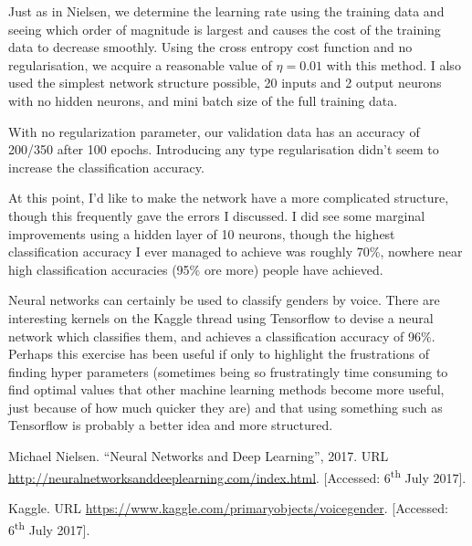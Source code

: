 \documentclass[10pt]{article}
\begin{document}
Just as in Nielsen, we determine the learning rate using the training data and seeing which order of magnitude is largest and causes the cost of the training data to decrease smoothly. Using the cross entropy cost function and no regularisation, we acquire a reasonable value of $\eta = 0.01$ with this method. I also used the simplest network structure possible, 20 inputs and 2 output neurons with no hidden neurons, and mini batch size of the full training data. \par
With no regularization parameter, our validation data has an accuracy of 200/350 after 100 epochs. Introducing any type regularisation didn't seem to increase the classification accuracy. \par
At this point, I'd like to make the network have a more complicated structure, though this frequently gave the errors I discussed. I did see some marginal improvements using a hidden layer of 10 neurons, though the highest classification accuracy I ever managed to achieve was roughly 70$\%$, nowhere near high  classification accuracies (95$\%$ ore more) people have achieved. \par
Neural networks can certainly be used to classify genders by voice. There are interesting kernels on the Kaggle thread using Tensorflow to devise a neural network which classifies them, and achieves a classification accuracy of 96$\%$. Perhaps this exercise has been useful if only to highlight the frustrations of finding hyper parameters (sometimes being so frustratingly time consuming to find optimal values that other machine learning methods become more useful, just because of how much quicker they are) and that using something such as Tensorflow is probably a better idea and more structured.


\begin{thebibliography}{9}
	Michael Nielsen.
	``Neural Networks and Deep Learning'',
	2017.
	URL \url{http://neuralnetworksanddeeplearning.com/index.html}.
	[Accessed: 6\textsuperscript{th} July 2017].

	
	Kaggle.
	URL \url{https://www.kaggle.com/primaryobjects/voicegender}.
	[Accessed: 6\textsuperscript{th} July 2017].
\end{thebibliography}
\end{document}
